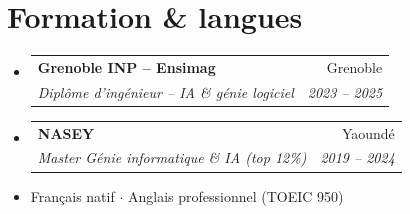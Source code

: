 \documentclass[a4paper,10.5pt]{article}
\makeatletter
\newcommand{\resumeSubheading}[4]{\vspace{3pt}\item\begin{tabular*}{0.97\textwidth}[t]{l@{\extracolsep{\fill}}r}\textbf{#1}&{#2}\\\textit{\small #3}&\textit{\small #4}\\\end{tabular*}\vspace{1pt}}
\newcommand{\resumeSubHeadingListStart}{\begin{itemize}[leftmargin=0.08in,label={}]}
\newcommand{\resumeSubHeadingListEnd}{\end{itemize}}
\makeatother
\begin{document}
\section{Formation \& langues}
\resumeSubHeadingListStart
  \resumeSubheading{Grenoble INP -- Ensimag}{Grenoble}{Dipl\^ome d'ing\'enieur -- IA \& g\'enie logiciel}{2023 -- 2025}
  \resumeSubheading{NASEY}{Yaound\'e}{Master G\'enie informatique \& IA (top 12\%)}{2019 -- 2024}
\resumeSubHeadingListEnd
\begin{itemize}[leftmargin=0.08in,label={}]\item Fran\c{c}ais natif $\cdot$ Anglais professionnel (TOEIC 950)\end{itemize}
\end{document}
